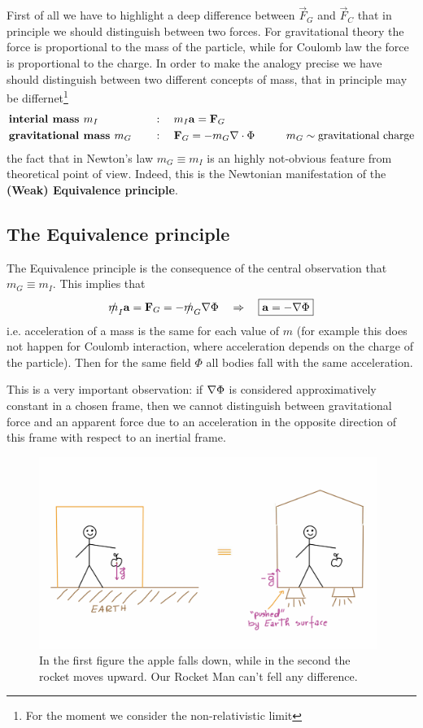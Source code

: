 \documentclass[../main/main.tex]{subfiles}
\begin{document}
\skipline
First of all we have to highlight a deep difference between $\vec F_G$ and $\vec F_C$ that in principle we should distinguish between two forces. For gravitational theory the force is proportional to the mass of the particle, while for Coulomb law the force is proportional to the charge. In order to make the analogy precise we have should distinguish between two different concepts of mass, that in principle may be differnet\footnote{For the moment we consider the non-relativistic limit}
\begin{alignat*}{2}
&\text{\textbf{interial mass }} m_I\quad&&:\quad m_I\vec a=\vec F_G\\
&\text{\textbf{gravitational mass }} m_G\quad&&:\quad\vec F_G=-m_G\vect\nabla\cdot\Phi\hspace{1cm}m_G\sim\text{gravitational charge}
\end{alignat*}
the fact that in Newton's law $m_G\equiv m_I$ is an highly not-obvious feature from theoretical point of view. Indeed, this is the Newtonian manifestation of the \textbf{(Weak) Equivalence principle}.

\subsection{The Equivalence principle}

The Equivalence principle is the consequence of the central observation that $m_G\equiv m_I$. This implies that
\[\slashed m_I\vec a=\vec F_G=-\slashed m_G\vect\nabla\Phi\quad\Rightarrow\quad\boxed{\vec a=-\vect\nabla\Phi}\]
i.e. acceleration of a mass is the same for each value of $m$ (for example this does not happen for Coulomb interaction, where acceleration depends on the charge of the particle). Then for the same field $\Phi$ all bodies fall with the same acceleration. 

This is a very important observation: if $\vect\nabla\Phi$ is considered approximatively constant in a chosen frame, then we cannot distinguish between gravitational force and an apparent force due to an acceleration in the opposite direction of this frame with respect to an inertial frame. 


\begin{figure}[H]
\centering
\includegraphics[width=11cm]{../img/equivalence-principle.jpg}
\caption{In the first figure the apple falls down, while in the second the rocket moves upward. Our Rocket Man can't fell any difference.}
\end{figure}
\end{document}
